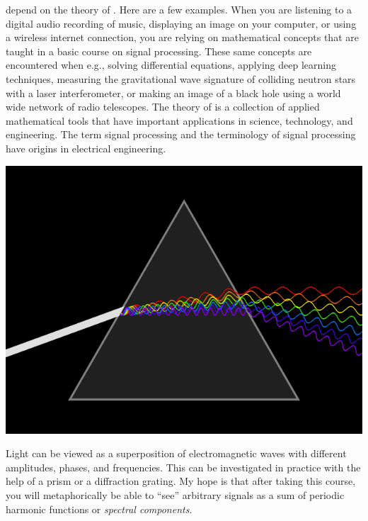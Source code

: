 
 depend on the theory of
. Here are a few examples. When
you are listening to a digital audio recording of music, displaying an
image on your computer, or using a wireless internet connection, you
are relying on mathematical concepts that are taught in a basic course
on signal processing. These same concepts are encountered when e.g.,
solving differential equations, applying deep learning techniques,
measuring the gravitational wave signature of colliding neutron stars
with a laser interferometer, or making an image of a black hole using
a world wide network of radio telescopes. The theory
of \emph{} is a
collection of applied mathematical tools that have important
applications in science, technology, and engineering. The term signal
processing and the terminology of signal processing have origins in
electrical engineering.

\begin{marginfigure}[-4.2cm]
\begin{center}
\includegraphics[width=\textwidth]{ch01/figures/prism.png}
\end{center}
\caption{Light can be viewed as a superposition of electromagnetic waves
with different amplitudes, phases, and frequencies. This can be
investigated in practice with the help of a prism or a diffraction
grating. My hope is that after taking this course, you will
metaphorically be able to ``see'' arbitrary signals as a sum of
periodic harmonic functions or \emph{spectral components}.}
\label{fig:prism}
\end{marginfigure}

